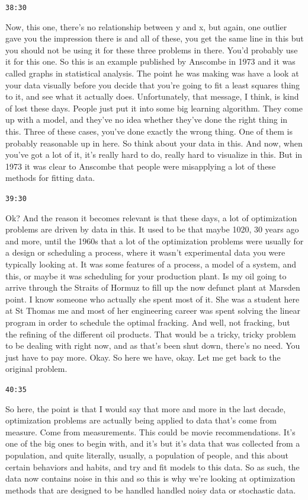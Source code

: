 \documentclass[11pt,a4paper]{article}
\newcommand{\timestamp}[1]{%
  \par\vspace{0.35em}%
  \noindent\colorbox{timestampback}{\textcolor{timestampblue}{\small\texttt{#1}}}%
  \par\vspace{0.2em}%
}
\begin{document}
\timestamp{38:30}

Now, this one, there's no relationship between y and x, but again, one outlier gave you the impression there is and all of these, you get the same line in this but you should not be using it for these three problems in there. You'd probably use it for this one. So this is an example published by Anscombe in 1973 and it was called graphs in statistical analysis. The point he was making was have a look at your data visually before you decide that you're going to fit a least squares thing to it, and see what it actually does. Unfortunately, that message, I think, is kind of lost these days. People just put it into some big learning algorithm. They come up with a model, and they've no idea whether they've done the right thing in this. Three of these cases, you've done exactly the wrong thing. One of them is probably reasonable up in here. So think about your data in this. And now, when you've got a lot of it, it's really hard to do, really hard to visualize in this. But in 1973 it was clear to Anscombe that people were misapplying a lot of these methods for fitting data.



\timestamp{39:30}

Ok? And the reason it becomes relevant is that these days, a lot of optimization problems are driven by data in this. It used to be that maybe 1020, 30 years ago and more, until the 1960s that a lot of the optimization problems were usually for a design or scheduling a process, where it wasn't experimental data you were typically looking at. It was some features of a process, a model of a system, and this, or maybe it was scheduling for your production plant. Is my oil going to arrive through the Straits of Hormuz to fill up the now defunct plant at Marsden point. I know someone who actually she spent most of it. She was a student here at St Thomas me and most of her engineering career was spent solving the linear program in order to schedule the optimal fracking. And well, not fracking, but the refining of the different oil products. That would be a tricky, tricky problem to be dealing with right now, and as that's been shut down, there's no need. You just have to pay more. Okay. So here we have, okay. Let me get back to the original problem.



\timestamp{40:35}

So here, the point is that I would say that more and more in the last decade, optimization problems are actually being applied to data that's come from measure. Come from measurements. This could be movie recommendations. It's one of the big ones to begin with, and it's but it's data that was collected from a population, and quite literally, usually, a population of people, and this about certain behaviors and habits, and try and fit models to this data. So as such, the data now contains noise in this and so this is why we're looking at optimization methods that are designed to be handled handled noisy data or stochastic data.
\end{document}

